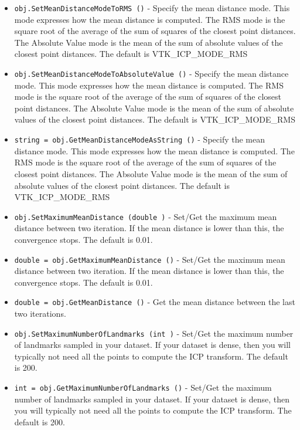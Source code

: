 \begin{itemize}
\item  \verb|obj.SetMeanDistanceModeToRMS ()| -  Specify the mean distance mode. This mode expresses how the mean 
 distance is computed. The RMS mode is the square root of the average
 of the sum of squares of the closest point distances. The Absolute
 Value mode is the mean of the sum of absolute values of the closest
 point distances. The default is VTK\_ICP\_MODE\_RMS

\item  \verb|obj.SetMeanDistanceModeToAbsoluteValue ()| -  Specify the mean distance mode. This mode expresses how the mean 
 distance is computed. The RMS mode is the square root of the average
 of the sum of squares of the closest point distances. The Absolute
 Value mode is the mean of the sum of absolute values of the closest
 point distances. The default is VTK\_ICP\_MODE\_RMS

\item  \verb|string = obj.GetMeanDistanceModeAsString ()| -  Specify the mean distance mode. This mode expresses how the mean 
 distance is computed. The RMS mode is the square root of the average
 of the sum of squares of the closest point distances. The Absolute
 Value mode is the mean of the sum of absolute values of the closest
 point distances. The default is VTK\_ICP\_MODE\_RMS

\item  \verb|obj.SetMaximumMeanDistance (double )| -  Set/Get the maximum mean distance between two iteration. If the mean
 distance is lower than this, the convergence stops. The default 
 is 0.01.

\item  \verb|double = obj.GetMaximumMeanDistance ()| -  Set/Get the maximum mean distance between two iteration. If the mean
 distance is lower than this, the convergence stops. The default 
 is 0.01.

\item  \verb|double = obj.GetMeanDistance ()| -  Get the mean distance between the last two iterations.

\item  \verb|obj.SetMaximumNumberOfLandmarks (int )| -  Set/Get the maximum number of landmarks sampled in your dataset.
 If your dataset is dense, then you will typically not need all the 
 points to compute the ICP transform. The default is 200.

\item  \verb|int = obj.GetMaximumNumberOfLandmarks ()| -  Set/Get the maximum number of landmarks sampled in your dataset.
 If your dataset is dense, then you will typically not need all the 
 points to compute the ICP transform. The default is 200.


\end{itemize}
